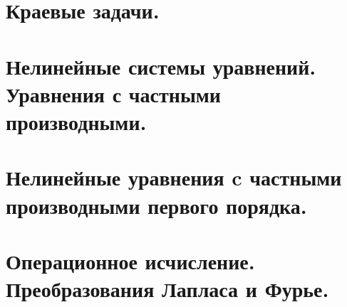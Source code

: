 \documentclass[fleqn, 12pt, a4paper, titlepage]{extarticle}
\begin{document}
		\section*{Краевые задачи.}
		

		
		\section*{Нелинейные системы уравнений. Уравнения с частными производными.}
		


		\section*{Нелинейные уравнения c частными производными первого порядка.}
		


		\section*{Операционное исчисление. Преобразования Лапласа и Фурье.}
		

\end{document}
